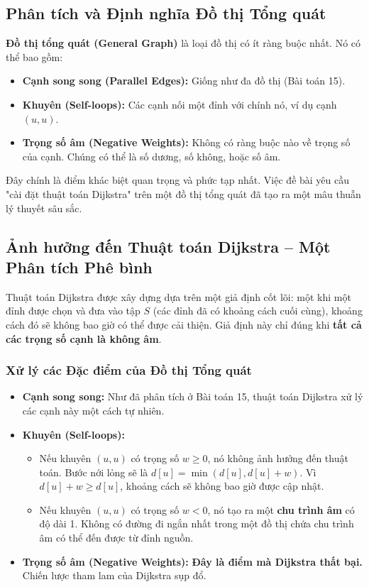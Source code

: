 \documentclass[a4paper,12pt]{article}
\begin{document}
\subsection{Phân tích và Định nghĩa Đồ thị Tổng quát}
\textbf{Đồ thị tổng quát (General Graph)} là loại đồ thị có ít ràng buộc nhất. Nó có thể bao gồm:
\begin{itemize}
    \item \textbf{Cạnh song song (Parallel Edges):} Giống như đa đồ thị (Bài toán 15).
    \item \textbf{Khuyên (Self-loops):} Các cạnh nối một đỉnh với chính nó, ví dụ cạnh $(u, u)$.
    \item \textbf{Trọng số âm (Negative Weights):} Không có ràng buộc nào về trọng số của cạnh. Chúng có thể là số dương, số không, hoặc số âm.
\end{itemize}
Đây chính là điểm khác biệt quan trọng và phức tạp nhất. Việc đề bài yêu cầu "cài đặt thuật toán Dijkstra" trên một đồ thị tổng quát đã tạo ra một mâu thuẫn lý thuyết sâu sắc.

\subsection{Ảnh hưởng đến Thuật toán Dijkstra -- Một Phân tích Phê bình}
Thuật toán Dijkstra được xây dựng dựa trên một giả định cốt lõi: một khi một đỉnh được chọn và đưa vào tập $S$ (các đỉnh đã có khoảng cách cuối cùng), khoảng cách đó sẽ không bao giờ có thể được cải thiện. Giả định này chỉ đúng khi \textbf{tất cả các trọng số cạnh là không âm}.

\subsubsection{Xử lý các Đặc điểm của Đồ thị Tổng quát}
\begin{itemize}
    \item \textbf{Cạnh song song:} Như đã phân tích ở Bài toán 15, thuật toán Dijkstra xử lý các cạnh này một cách tự nhiên.
    \item \textbf{Khuyên (Self-loops):}
    \begin{itemize}
        \item Nếu khuyên $(u, u)$ có trọng số $w \geq 0$, nó không ảnh hưởng đến thuật toán. Bước nới lỏng sẽ là $d[u] = \min(d[u], d[u] + w)$. Vì $d[u] + w \geq d[u]$, khoảng cách sẽ không bao giờ được cập nhật.
        \item Nếu khuyên $(u, u)$ có trọng số $w < 0$, nó tạo ra một \textbf{chu trình âm} có độ dài 1. Không có đường đi ngắn nhất trong một đồ thị chứa chu trình âm có thể đến được từ đỉnh nguồn.
    \end{itemize}
    \item \textbf{Trọng số âm (Negative Weights):} \textbf{Đây là điểm mà Dijkstra thất bại.} Chiến lược tham lam của Dijkstra sụp đổ.
\end{itemize}
\end{document}
